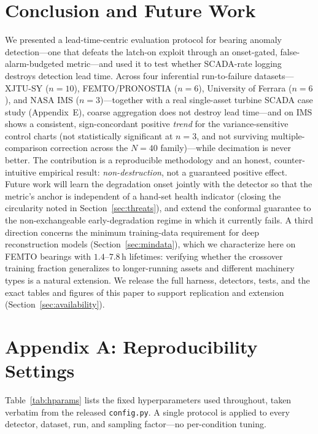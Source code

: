 \documentclass[journal]{IEEEtran}
\begin{document}
\section{Conclusion and Future Work}
We presented a lead-time-centric evaluation protocol for bearing anomaly
detection---one that defeats the latch-on exploit through an onset-gated,
false-alarm-budgeted metric---and used it to test whether SCADA-rate logging
destroys detection lead time. Across four inferential run-to-failure datasets---XJTU-SY ($n{=}10$),
FEMTO/PRONOSTIA ($n{=}6$), University of Ferrara ($n{=}6$), and NASA IMS
($n{=}3$)---together with a real single-asset turbine SCADA case study
(Appendix~E), coarse aggregation does not destroy lead time---and on IMS shows a consistent, sign-concordant positive
\emph{trend} for the variance-sensitive control charts (not statistically
significant at $n{=}3$, and not surviving multiple-comparison correction across
the $N{=}40$ family)---while
decimation is never better. The contribution is a reproducible methodology and
an honest, counter-intuitive empirical result: \emph{non-destruction}, not a
guaranteed positive effect. Future work will
learn the degradation onset jointly with the detector so that
the metric's anchor is independent of a hand-set health indicator (closing the
circularity noted in Section~\ref{sec:threats}), and extend the conformal
guarantee to the non-exchangeable early-degradation regime in which it currently
fails. A third direction concerns the minimum training-data requirement for deep
reconstruction models (Section~\ref{sec:mindata}), which we characterize here on
FEMTO bearings with $1.4$--$7.8$\,h lifetimes: verifying whether the crossover
training fraction generalizes to longer-running assets and different machinery types
is a natural extension. We release the full harness, detectors, tests, and the exact
tables and figures of this paper to support replication and extension
(Section~\ref{sec:availability}).

\section*{Appendix A: Reproducibility Settings}
Table~\ref{tab:hparams} lists the fixed hyperparameters used throughout, taken
verbatim from the released \texttt{config.py}. A single protocol is applied to
every detector, dataset, run, and sampling factor---no per-condition tuning.
\end{document}
